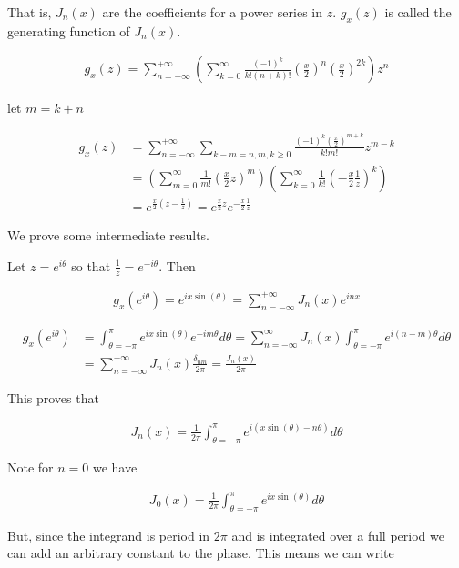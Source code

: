 \documentclass[12pt]{article}
\begin{document}
That is, $J_n(x)$ are the coefficients for a power series in $z$. $g_x(z)$ is called the generating function of $J_{n}(x)$.

\begin{align}
g_x(z) = \sum_{n=-\infty}^{+\infty} \left(\sum_{k=0}^{\infty} \frac{(-1)^k}{k! (n+k)!} \left(\frac{x}{2}\right)^n \left(\frac{x}{2}\right)^{2k} \right)z^n
\end{align}

let $m=k+n$

\begin{align}
g_{x}(z) &= \sum_{n=-\infty}^{+\infty} \sum_{k-m = n, m,k\ge 0} \frac{(-1)^k \left(\frac{x}{2}\right)^{m+k}}{k!m!} z^{m-k}\\
&= \left(\sum_{m=0}^{\infty} \frac{1}{m!}\left(\frac{x}{2} z\right)^m\right)\left(\sum_{k=0}^{\infty} \frac{1}{k!} \left(-\frac{x}{2} \frac{1}{z}\right)^k\right)\\
&= e^{\frac{x}{2}\left(z-\frac{1}{z}\right)} = e^{\frac{x}{2} z} e^{-\frac{x}{2} \frac{1}{z}}
\end{align}

We prove some intermediate results. 

Let $z = e^{i \theta}$ so that $\frac{1}{z} = e^{-i\theta}$. Then 

\begin{align}
g_x\left(e^{i\theta}\right) = e^{i x \sin(\theta)} = \sum_{n=-\infty}^{+\infty} J_n(x) e^{inx}
\end{align}

\begin{align}
g_x(e^{i\theta}) &= \int_{\theta = -\pi}^{\pi} e^{ix \sin(\theta)} e^{-i m \theta} d\theta = \sum_{n=-\infty}^{\infty}J_n(x)\int_{\theta = -\pi}^{\pi} e^{i(n-m)\theta} d\theta\\
&= \sum_{n=-\infty}^{+\infty} J_n(x) \frac{\delta_{nm}}{2\pi} = \frac{J_n(x)}{2\pi}
\end{align}

This proves that

\begin{align}
J_n(x) = \frac{1}{2\pi} \int_{\theta = -\pi}^{\pi} e^{i(x\sin(\theta) - n \theta)} d\theta
\end{align}

Note for $n=0$ we have

\begin{align}
J_0(x) = \frac{1}{2\pi} \int_{\theta = -\pi}^{\pi} e^{ix\sin(\theta)} d\theta
\end{align}

But, since the integrand is period in $2\pi$ and is integrated over a full period we can add an arbitrary constant to the phase. This means we can write
\end{document}
